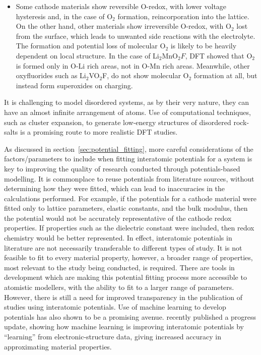 \documentclass[../main.tex]{subfiles}
\begin{document}
\begin{itemize}
    \item Some cathode materials show reversible O-redox, with lower voltage hysteresis and, in the case of O$_2$ formation, reincorporation into the lattice.\cite{Sharpe2020} On the other hand, other materials show irreversible O-redox, with O$_2$ lost from the surface, \cite{Nakayama2020, Chen2016, House2020a} which leads to unwanted side reactions with the electrolyte. The formation and potential loss of molecular O$_2$ is likely to be heavily dependent on local structure. In the case of Li$_2$MnO$_2F$, DFT showed that O$_2$ is formed only in O-Li rich areas, not in O-Mn rich areas.\cite{Sharpe2020} Meanwhile, other oxyfluorides such as Li$_2$VO$_2$F, do not show molecular O$_2$ formation at all, but instead form superoxides on charging.\cite{Chang2020} 
\end{itemize}

It is challenging to model disordered systems, as by their very nature, they can have an almost infinite arrangement of atoms. Use of computational techniques, such as cluster expansion, to generate low-energy structures of disordered rock-salts is a promising route to more realistic DFT studies.\cite{Lun2020}

As discussed in section~\ref{sec:potential_fitting}, more careful considerations of the factors/parameters to include when fitting interatomic potentials for a system is key to improving the quality of research conducted through potentials-based modelling. It is commonplace to reuse potentials from literature sources, without determining how they were fitted, which can lead to inaccuracies in the calculations performed. For example, if the potentials for a cathode material were fitted only to lattice parameters, elastic constants, and the bulk modulus, then the potential would not be accurately representative of the cathode redox properties. If properties such as the dielectric constant were included, then redox chemistry would be better represented. In effect, interatomic potentials in literature are not necessarily transferable to different types of study. It is not feasible to fit to every material property, however, a broader range of properties, most relevant to the study being conducted, is required. There are tools in development \cite{gale_empirical_1996, Stukowski_2017, wen_kim-compliant_2017, Morgan2020BuckFit} which are making this potential fitting process more accessible to atomistic modellers, with the ability to fit to a larger range of parameters. However, there is still a need for improved transparency in the publication of studies using interatomic potentials. Use of machine learning to develop potentials has also shown to be a promising avenue. \citeauthor{deringer2019machine} recently published a progress update, showing how machine learning is improving interatomic potentials by ``learning'' from electronic-structure data, giving increased accuracy in approximating material properties. \cite{deringer2019machine}
\end{document}
